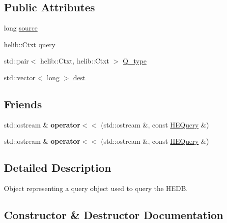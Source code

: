 \subsection*{Public Attributes}
\begin{DoxyCompactItemize}
\item 
long \hyperlink{classHDB__supergate___1_1HEQuery_aebda8c020d4bd15f7da4128a7b5028bc}{source}
\item 
helib\+::\+Ctxt \hyperlink{classHDB__supergate___1_1HEQuery_a4f6c52dc14ce033598e3ee9a7411fa75}{query}
\item 
std\+::pair$<$ helib\+::\+Ctxt, helib\+::\+Ctxt $>$ \hyperlink{classHDB__supergate___1_1HEQuery_a21c317527c7f5873d4ca2880c944611d}{Q\+\_\+type}
\item 
std\+::vector$<$ long $>$ \hyperlink{classHDB__supergate___1_1HEQuery_a5b5a2943869cb69980d62390203aac33}{dest}
\end{DoxyCompactItemize}
\subsection*{Friends}
\begin{DoxyCompactItemize}
\item 
\mbox{\label{classHDB__supergate___1_1HEQuery_a63440ce52ff551d8717927fd957e11f9}} 
std\+::ostream \& {\bfseries operator$<$$<$} (std\+::ostream \&, const \hyperlink{classHDB__supergate___1_1HEQuery}{H\+E\+Query} \&)
\item 
\mbox{\label{classHDB__supergate___1_1HEQuery_a63440ce52ff551d8717927fd957e11f9}} 
std\+::ostream \& {\bfseries operator$<$$<$} (std\+::ostream \&, const \hyperlink{classHDB__supergate___1_1HEQuery}{H\+E\+Query} \&)
\end{DoxyCompactItemize}


\subsection{Detailed Description}
Object representing a query object used to query the H\+E\+DB. 

\subsection{Constructor \& Destructor Documentation}
\mbox{\label{classHDB__supergate___1_1HEQuery_aa860d9296f75ed1c4c39e81564108f18}} 
